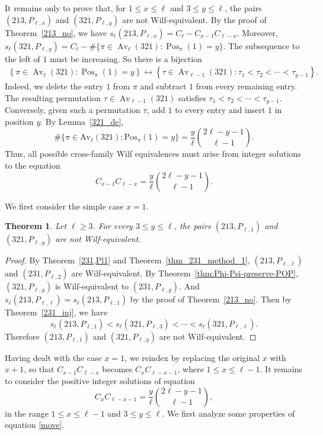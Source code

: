 \documentclass[11pt]{article}
\newtheorem{thm}{Theorem}[section]
\begin{document}
It remains only to prove that, for $1\leq x\leq\ell$ and $3\leq y\leq\ell$,
the pairs $(213,P_{\ell,x})$ and $(321,P_{\ell,y})$ are not Wilf-equivalent.
By the proof of Theorem~\ref{213_no}, we have
$s_\ell(213,P_{\ell,x})=C_\ell-C_{x-1}C_{\ell-x}$.
Moreover,
$s_\ell(321,P_{\ell,y})
=
C_\ell-\#\{\pi\in\operatorname{Av}_\ell(321):
\operatorname{Pos}_\pi(1)=y\}$.
The subsequence to the left of $1$ must be increasing. So there is a bijection
\begin{align*}
\left\{
\pi\in\operatorname{Av}_\ell(321):
\operatorname{Pos}_\pi(1)=y
\right\}
\longleftrightarrow
\left\{
\tau\in\operatorname{Av}_{\ell-1}(321):
\tau_1<\tau_2<\cdots<\tau_{y-1}
\right\}.
\end{align*}
Indeed, we delete the entry $1$ from $\pi$ and subtract $1$ from every
remaining entry. The resulting permutation
$\tau\in\operatorname{Av}_{\ell-1}(321)$ satisfies
$\tau_1<\tau_2<\cdots<\tau_{y-1}$.
Conversely, given such a permutation $\tau$, add $1$ to every entry
and insert $1$ in position $y$. By Lemma~\ref{321_de},
$$\#\{\pi\in\text{Av}_\ell(321):\text{Pos}_\pi(1)=y\}=\frac y\ell\binom{2\ell-y-1}{\ell-1}.$$
Thus, all possible cross-family Wilf equivalences must arise from integer
solutions to the equation
\begin{equation}\label{eq:catalan-ballot}
C_{x-1}C_{\ell-x}
=
\frac{y}{\ell}
\binom{2\ell-y-1}{\ell-1}.
\end{equation}

We first consider the simple case $x=1$. 
\begin{thm}\label{thm:x1-versus-321}
Let $\ell\ge 3$. For every $3\le y\le\ell$, the pairs
$(213,P_{\ell,1})$ and $(321,P_{\ell,y})$
are not Wilf-equivalent.
\end{thm}

\begin{proof}
By Theorem~\ref{231,Pl1} and Theorem~\ref{thm_231_method_1}, $(213,P_{\ell,\ell})$ and $(231,P_{\ell,2})$ are Wilf-equivalent. By Theorem~\ref{thm:Phi-Psi-preserve-POP}, $(321,P_{\ell,y})$ is Wilf-equivalent to $(231,P_{\ell,y})$. And $s_\ell(213,P_{\ell,\ell})=s_\ell(213,P_{\ell,1})$ by the proof of Theorem~\ref{213_no}. Then by Theorem~\ref{231_inj}, we have
\begin{equation*}
s_\ell(213,P_{\ell,1})<s_\ell(321,P_{\ell,3})<\cdots<s_\ell(321,P_{\ell,\ell}).
\end{equation*}
Therefore $(213,P_{\ell,1})$ and $(321,P_{\ell,y})$ are not Wilf-equivalent.
\end{proof}
Having dealt with the case $x=1$, 
we reindex by replacing the original $x$ with $x+1$, 
so that $C_{x-1}C_{\ell-x}$ becomes $C_xC_{\ell-x-1}$, where $1\le x\le\ell-1$.
It remains to consider the positive integer solutions of equation 
\begin{equation}\label{move}
C_{x}C_{\ell-x-1}
=
\frac{y}{\ell}
\binom{2\ell-y-1}{\ell-1},
\end{equation}
in the range $1\le x\le \ell-1$ and $3\le y\le \ell$.
We first analyze some properties of equation \eqref{move}.
\end{document}
